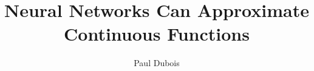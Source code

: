 \documentclass[]{article}
\title{Neural Networks Can Approximate Continuous Functions}
\author{Paul Dubois}
\date{}
\begin{document}
	
	\maketitle
	
	\begin{abstract}
		
	\end{abstract}
	
	\section{}
	
\end{document}
